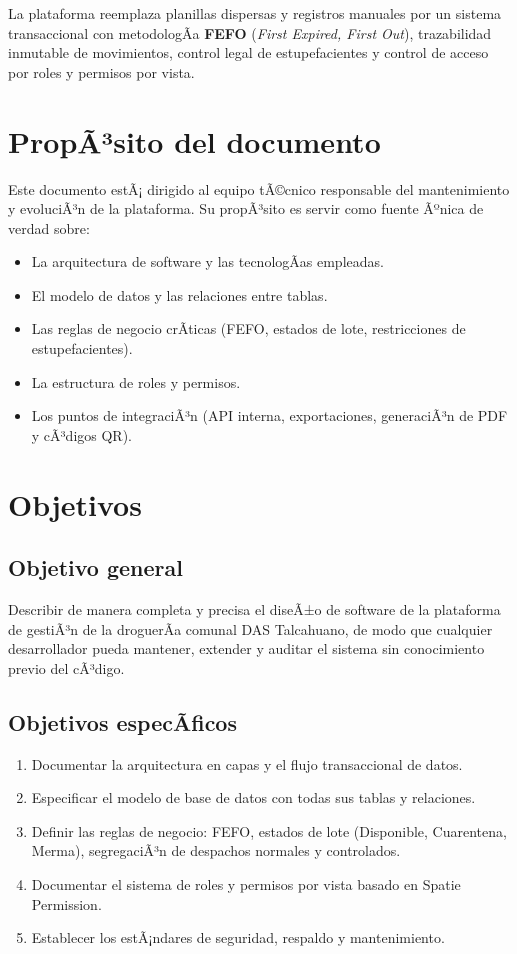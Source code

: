 ﻿\documentclass[a4paper, 12pt]{article}
\begin{document}
La plataforma reemplaza planillas dispersas y registros manuales por un sistema transaccional con metodologÃ­a \textbf{FEFO} (\textit{First Expired, First Out}), trazabilidad inmutable de movimientos, control legal de estupefacientes y control de acceso por roles y permisos por vista.

\section{PropÃ³sito del documento}

Este documento estÃ¡ dirigido al equipo tÃ©cnico responsable del mantenimiento y evoluciÃ³n de la plataforma. Su propÃ³sito es servir como fuente Ãºnica de verdad sobre:
\begin{itemize}
    \item La arquitectura de software y las tecnologÃ­as empleadas.
    \item El modelo de datos y las relaciones entre tablas.
    \item Las reglas de negocio crÃ­ticas (FEFO, estados de lote, restricciones de estupefacientes).
    \item La estructura de roles y permisos.
    \item Los puntos de integraciÃ³n (API interna, exportaciones, generaciÃ³n de PDF y cÃ³digos QR).
\end{itemize}

\section{Objetivos}

\subsection{Objetivo general}
Describir de manera completa y precisa el diseÃ±o de software de la plataforma de gestiÃ³n de la droguerÃ­a comunal DAS Talcahuano, de modo que cualquier desarrollador pueda mantener, extender y auditar el sistema sin conocimiento previo del cÃ³digo.

\subsection{Objetivos especÃ­ficos}
\begin{enumerate}
    \item Documentar la arquitectura en capas y el flujo transaccional de datos.
    \item Especificar el modelo de base de datos con todas sus tablas y relaciones.
    \item Definir las reglas de negocio: FEFO, estados de lote (Disponible, Cuarentena, Merma), segregaciÃ³n de despachos normales y controlados.
    \item Documentar el sistema de roles y permisos por vista basado en Spatie Permission.
    \item Establecer los estÃ¡ndares de seguridad, respaldo y mantenimiento.
\end{enumerate}
\end{document}
